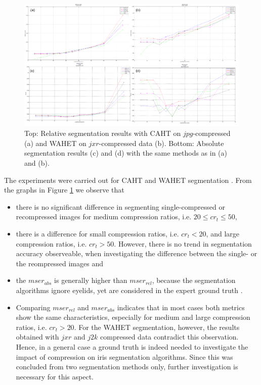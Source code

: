 \documentclass[10pt,twocolumn,letterpaper]{article}
\begin{document}
\begin{figure}[h]
	\begin{center}
		
	\includegraphics[width=\linewidth]{img/segResults}
\end{center}
	\caption{Top: Relative segmentation results with CAHT on $jpg$-compressed (a) and WAHET on $jxr$-compressed data (b). Bottom: Absolute segmentation results (c) and (d) with the same methods as in (a) and (b).}
	\label{fig:segResults}
	
\end{figure}

The experiments were carried out for CAHT and WAHET segmentation \cite{rathgeb}. From the graphs in Figure \ref{fig:segResults} we observe that

\begin{itemize}
 \item there is no significant difference in segmenting single-compressed or recompressed images for medium compression ratios, i.e. $ 20 \leq cr_t \leq 50 $,
 \item there is a difference for small compression ratios, i.e. $cr_t < 20$, and large compression ratios, i.e. $cr_t > 50$. However, there is no trend in segmentation accuracy observeable, when investigating the difference between the single- or the reompressed images and%
 \item the $mser_{abs}$ is generally higher than $mser_{rel}$, because the segmentation algorithms ignore eyelids, yet are considered in the expert ground truth \cite{severeCompression}.
 \item Comparing $mser_{rel}$ and $mser_{abs}$ indicates that in most cases both metrics show the same characteristics, especially for medium and large compression ratios, i.e. $cr_t > 20$. For the WAHET segmentation, however, the results obtained with $jxr$ and $j2k$ compressed data contradict this observation. Hence, in a general case a ground truth is indeed needed to investigate the impact of compression on iris segmentation algorithms. Since this was concluded from two segmentation methods only, further investigation is necessary for this aspect.
\end{itemize}
\end{document}
